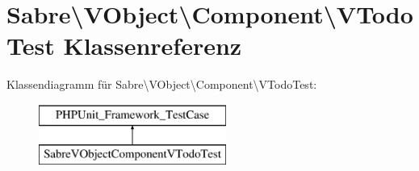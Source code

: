 \hypertarget{class_sabre_1_1_v_object_1_1_component_1_1_v_todo_test}{}\section{Sabre\textbackslash{}V\+Object\textbackslash{}Component\textbackslash{}V\+Todo\+Test Klassenreferenz}
\label{class_sabre_1_1_v_object_1_1_component_1_1_v_todo_test}
Klassendiagramm für Sabre\textbackslash{}V\+Object\textbackslash{}Component\textbackslash{}V\+Todo\+Test\+:\begin{figure}[H]
\begin{center}
\leavevmode
\includegraphics[height=2.000000cm]{class_sabre_1_1_v_object_1_1_component_1_1_v_todo_test}
\end{center}
\end{figure}
